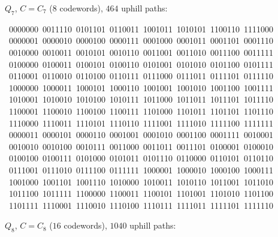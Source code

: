 \medskip\noindent$Q_7$, $C=C_7$ ($8$ codewords), $464$ uphill paths:
\begin{flushleft}\footnotesize\ttfamily
{}\ 0000000\ 0011110\ 0101101\ 0110011\ 1001011\ 1010101\ 1100110\ 1111000\\
\ 0000001\ 0000010\ 0000100\ 0000111\ 0001000\ 0001011\ 0001101\ 0001110\\
\ 0010000\ 0010011\ 0010101\ 0010110\ 0011001\ 0011010\ 0011100\ 0011111\\
\ 0100000\ 0100011\ 0100101\ 0100110\ 0101001\ 0101010\ 0101100\ 0101111\\
\ 0110001\ 0110010\ 0110100\ 0110111\ 0111000\ 0111011\ 0111101\ 0111110\\
\ 1000000\ 1000011\ 1000101\ 1000110\ 1001001\ 1001010\ 1001100\ 1001111\\
\ 1010001\ 1010010\ 1010100\ 1010111\ 1011000\ 1011011\ 1011101\ 1011110\\
\ 1100001\ 1100010\ 1100100\ 1100111\ 1101000\ 1101011\ 1101101\ 1101110\\
\ 1110000\ 1110011\ 1110101\ 1110110\ 1111001\ 1111010\ 1111100\ 1111111\\
\ 0000011\ 0000101\ 0000110\ 0001001\ 0001010\ 0001100\ 0001111\ 0010001\\
\ 0010010\ 0010100\ 0010111\ 0011000\ 0011011\ 0011101\ 0100001\ 0100010\\
\ 0100100\ 0100111\ 0101000\ 0101011\ 0101110\ 0110000\ 0110101\ 0110110\\
\ 0111001\ 0111010\ 0111100\ 0111111\ 1000001\ 1000010\ 1000100\ 1000111\\
\ 1001000\ 1001101\ 1001110\ 1010000\ 1010011\ 1010110\ 1011001\ 1011010\\
\ 1011100\ 1011111\ 1100000\ 1100011\ 1100101\ 1101001\ 1101010\ 1101100\\
\ 1101111\ 1110001\ 1110010\ 1110100\ 1110111\ 1111011\ 1111101\ 1111110\\
\end{flushleft}
\noindent$Q_8$, $C=C_8$ ($16$ codewords), $1040$ uphill paths:
